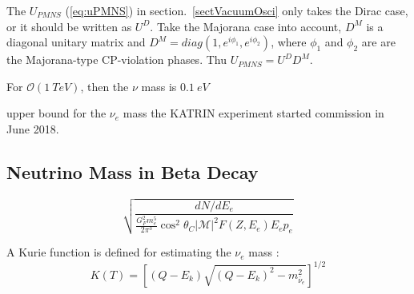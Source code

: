 The $U_{PMNS}$ (\ref{eq:uPMNS}) in section.~\ref{sectVacuumOsci} only takes the Dirac case, or it should be written as $U^D$. 
Take the Majorana case into account, $D^M$ is a diagonal unitary matrix and $D^M=diag(1,e^{i\phi_1},e^{i\phi_2})$, where $\phi_1$ and $\phi_2$ are are the Majorana-type CP-violation phases. Thu $U_{PMNS}=U^DD^M$.


For $\mathcal{O}(1~TeV)$, then the $\nu$ mass is $0.1~eV$


upper bound for the $\nu_e$ mass
the KATRIN experiment started commission in June 2018\cite{aker2019improved}.








\subsection{Neutrino Mass in Beta Decay}


\begin{equation}
\sqrt{\frac{dN/dE_e}{\frac{G^2_F m_e^5}{2\pi^3}\cos^2\theta_C|\mathcal{M}|^2F(Z,E_e)E_e p_e}}
\end{equation}

A Kurie function is defined for estimating the $\nu_e$ mass \cite{giunti2007fundamentals}:
\begin{equation}
K(T) =\left[(Q-E_k)\sqrt{(Q-E_k)^2-m^2_{\bar{\nu}_e}}\right]^{1/2}
\end{equation}

